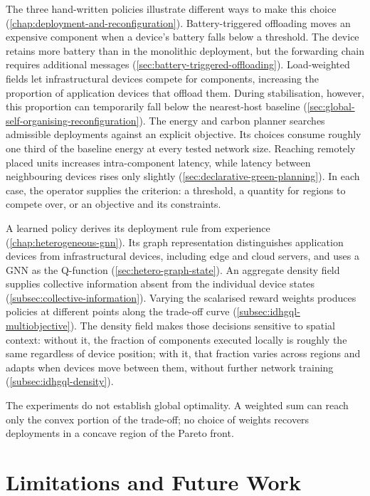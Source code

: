 The three hand-written policies illustrate different ways to make this choice (\cref{chap:deployment-and-reconfiguration}).
Battery-triggered offloading moves an expensive component when a device's battery falls below a threshold.
The device retains more battery than in the monolithic deployment,
but the forwarding chain requires additional messages (\cref{sec:battery-triggered-offloading}).
Load-weighted fields let infrastructural devices compete for components,
increasing the proportion of application devices that offload them.
During stabilisation, however, this proportion can temporarily fall below the nearest-host baseline (\cref{sec:global-self-organising-reconfiguration}).
The energy and carbon planner searches admissible deployments against an explicit objective.
Its choices consume roughly one third of the baseline energy at every tested network size.
Reaching remotely placed units increases intra-component latency,
while latency between neighbouring devices rises only slightly (\cref{sec:declarative-green-planning}).
In each case, the operator supplies the criterion:
a threshold, a quantity for regions to compete over, or an objective and its constraints.

A learned policy derives its deployment rule from experience (\cref{chap:heterogeneous-gnn}).
Its graph representation distinguishes application devices from infrastructural devices, including edge and cloud servers,
and uses a \ac{GNN} as the Q-function (\cref{sec:hetero-graph-state}).
An aggregate density field supplies collective information absent from the individual device states (\cref{subsec:collective-information}).
Varying the scalarised reward weights produces policies at different points along the trade-off curve (\cref{subsec:idhgql-multiobjective}).
The density field makes those decisions sensitive to spatial context:
without it, the fraction of components executed locally is roughly the same regardless of device position;
with it, that fraction varies across regions and adapts when devices move between them,
without further network training (\cref{subsec:idhgql-density}).

The experiments do not establish global optimality.
A weighted sum can reach only the convex portion of the trade-off;
no choice of weights recovers deployments in a concave region of the Pareto front.

\section{Limitations and Future Work}
\label{sec:limitations}
\label{sec:future-work}

